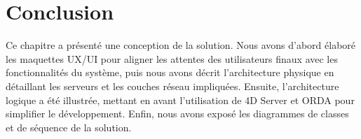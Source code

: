 

\section{Conclusion}
Ce chapitre a présenté une conception 
de la solution. Nous avons d'abord 
élaboré les maquettes UX/UI pour aligner les attentes 
des utilisateurs finaux avec les fonctionnalités 
du système, puis nous avons décrit l'architecture 
physique en détaillant les serveurs et les couches 
réseau impliquées. Ensuite, l'architecture logique 
a été illustrée, mettant en avant l'utilisation de 
4D Server et ORDA pour simplifier le développement. 
Enfin, nous avons exposé les diagrammes de classes 
et de séquence de la solution.